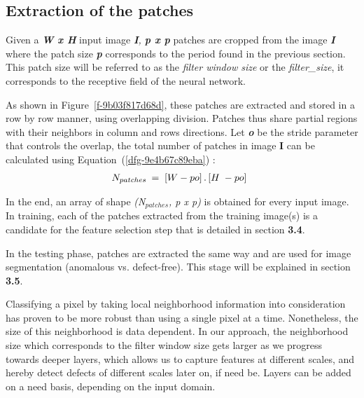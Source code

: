 \documentclass[3p,,preprint,review,12pt]{elsarticle}
\makeatletter
\def\fixFloatSize#1{}%
\makeatother
\begin{document}
\subsection{Extraction of the patches}
Given a \textbf{\textit{W x H}} input image \textit{\textbf{I}, \textbf{p x p}} patches are cropped from the image \textit{\textbf{I}} \textbf{\space }where the patch size \textit{\textbf{p}} corresponds to the period found in the previous section. This patch size will be referred to as the \textit{filter window size} or the \textit{filter\_size}, it corresponds to the receptive field of the neural network. 


\bgroup
\fixFloatSize{Figures/Figure3.jpg}
\begin{figure*}[!htbp]
\centering \makeatletter{}
\makeatother 
\caption{{Illustration of the patch extraction step with overlapping division}}
\label{f-9b03f817d68d}
\end{figure*}
\egroup
As shown in Figure~\ref{f-9b03f817d68d}, these patches are extracted and stored in a row by row manner, using overlapping division. Patches thus share partial regions with their neighbors in column and rows directions. Let \textbf{\textit{o}} be the stride parameter that controls the overlap, the total number of patches in image \textbf{I }can be calculated using Equation~(\ref{dfg-9e4b67c89eba}) :
\let\saveeqnno\theequation
\let\savefrac\frac
\def\dispfrac{\displaystyle\savefrac}
\begin{eqnarray}
\let\frac\dispfrac
\gdef\theequation{3}
\let\theHequation\theequation
\label{dfg-9e4b67c89eba}
\begin{array}{@{}l}N_{patches\;}=\;\left[\frac{W-p}o\right].\left[\frac{H\;-p}o\right]\end{array}
\end{eqnarray}
\global\let\theequation\saveeqnno
\addtocounter{equation}{-1}\ignorespaces 
In the end, an array of shape \textit{(N\ensuremath{_{patches}}, p x p)} is obtained for every input image. In training, each of the patches extracted from the training image(s) is a candidate for the feature selection step that is detailed in section \textbf{3.4}. 

In the testing phase, patches are extracted the same way and are used for image segmentation (anomalous vs. defect-free). This stage will be explained in section \textbf{3.5}.

Classifying a pixel by taking local neighborhood information into consideration has proven to be more robust than using a single pixel at a time. Nonetheless, the size of this neighborhood is data dependent. In our approach, the neighborhood size which corresponds to the filter window size gets larger as we progress towards deeper layers, which allows us to capture features at different scales, and hereby detect defects of different scales later on, if need be. Layers can be added on a need basis, depending on the input domain. 
\end{document}
